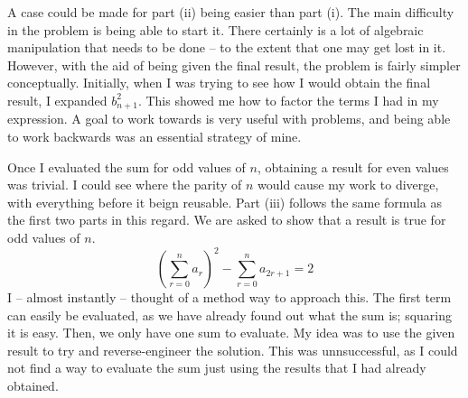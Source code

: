 \documentclass[12pt]{article}
\begin{document}
A case could be made for part (ii) being easier than part (i).
The main difficulty in the problem is being able to start it.
There certainly is a lot of algebraic manipulation that needs to be done -- to the extent that one may get lost in it.
However, with the aid of being given the final result, the problem is fairly simpler conceptually.
Initially, when I was trying to see how I would obtain the final result, I expanded $b^2_{n+1}$.
This showed me how to factor the terms I had in my expression.
A goal to work towards is very useful with problems, and being able to work backwards was an essential strategy of mine.

Once I evaluated the sum for odd values of $n$, obtaining a result for even values was trivial.
I could see where the parity of $n$ would cause my work to diverge, with everything before it beign reusable.
Part (iii) follows the same formula as the first two parts in this regard.
We are asked to show that a result is true for odd values of $n$.
\begin{equation}
    \left(\sum_{r=0}^{n} a_r \right)^2 - \sum_{r=0}^{n} a_{2r+1} = 2
\end{equation}
I -- almost instantly -- thought of a method way to approach this.
The first term can easily be evaluated, as we have already found out what the sum is; squaring it is easy.
Then, we only have one sum to evaluate.
My idea was to use the given result to try and reverse-engineer the solution.
This was unnsuccessful, as I could not find a way to evaluate the sum just using the results that I had already obtained.
\end{document}
